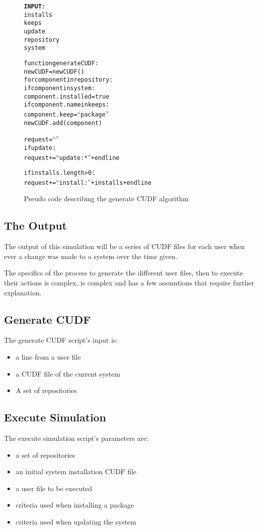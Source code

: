 \begin{figure}[htp]
\begin{center}
\begin{alltt}
\textbf{INPUT}:
installs
keeps
update
repository
system


function generateCUDF:
    newCUDF = new CUDF()
    for component in repository:
        if component in system:
            component.installed = true
            if component.name in keeps:
                component.keep = ``package''
        newCUDF.add(component)
    
    request = ``''
    if update:
        request += ``update: *'' + endline
        
    if installs.length > 0:
        request += ``install: ''  + installs + endline
    
\end{alltt}
\caption[Generate CUDF Pseudo Code]{Pseudo code describing the generate CUDF algorithm}
\label{generateCUDF}
\end{center}
\end{figure}


\subsection{The Output}
The output of this simulation will be a series of CUDF files for each user when ever a change was made to a system over the time given.

The specifics of the process to generate the different user files, then to execute their actions is complex, is complex and 
has a few assumtions that require further explanation.



\subsection{Generate CUDF}
The generate CUDF script's input is:
\begin{itemize}
  \item a line from a user file 
  \item a CUDF file of the current system
  \item A set of repositories
\end{itemize}


\subsection{Execute Simulation}
The execute simulation script's parameters are:
\begin{itemize}
  \item a set of repositories
  \item an initial system installation CUDF file
  \item a user file to be executed
  \item criteria used when installing a package
  \item criteria used when updating the system
\end{itemize}

